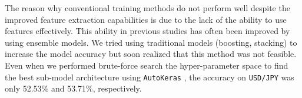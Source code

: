\documentclass[aps,prb,groupedaddress,twocolumn,showpacs,dvipdfmx,superscriptaddress,pdftex]{revtex4-2}
\begin{document}
The reason why conventional training methods do not perform well despite the improved feature extraction capabilities is due to the lack of the ability to use features effectively. This ability in previous studies has often been improved by using ensemble models. We tried using traditional models (boosting, stacking) to increase the model accuracy but soon realized that this method was not feasible. Even when we performed brute-force search the hyper-parameter space to find the best sub-model architecture using \verb|AutoKeras| \cite{jin2023autokeras}, the accuracy on \verb|USD/JPY| was only 52.53\% and 53.71\%, respectively.

\vspace{2mm}

\end{document}
